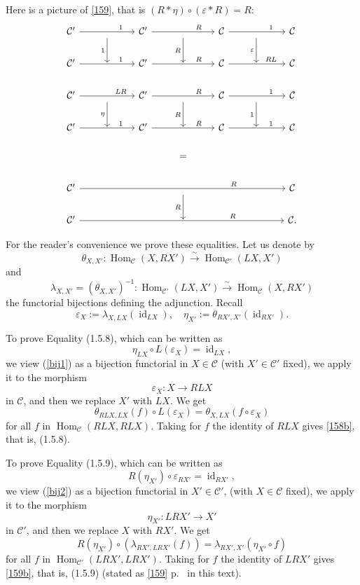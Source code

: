 \documentclass[12pt]{article}
\theoremstyle{remark}
\theoremstyle{definition}
\newcommand{\C}{\mathcal C}
\newcommand{\e}{\varepsilon}
\DeclareMathOperator{\id}{id}
\DeclareMathOperator{\Hom}{Hom}
\begin{document}
Here is a picture of \eqref{159}, that is $(R*\eta)\circ(\e*R)=R$: 
$$
\begin{tikzcd}
%
\C'\ar{rr}{}[near end]{1}&\ar{d}[swap]{1}&\C'\ar{rr}{}[near end]{R}&\ar{d}[swap]{R}&\C\ar{rr}{}[near end]{1}&\ar{d}[swap]{\e}&\C\\ 
%
\C'\ar{rr}{}[near end]{1}&{}&\C'\ar{rr}{}[near end]{R}&{}&\C\ar{rr}{}[near end]{RL}&{}&\C\\ 
%
\C'\ar{rr}{}[near end]{LR}&\ar{d}[swap]{\eta}&\C'\ar{rr}{}[near end]{R}&\ar{d}[swap]{R}&\C\ar{rr}{}[near end]{1}&\ar{d}[swap]{1}&\C\\ 
%
\C'\ar{rr}{}[near end]{1}&{}&\C'\ar{rr}{}[near end]{R}&{}&\C\ar{rr}{}[near end]{1}&{}&\C\\ 
%
&&&=\\ 
%
\C'\ar{rrrrrr}[near end]{R}&&&{}\ar{d}[swap]{R}&&&\C\\
%
\C'\ar{rrrrrr}[near end]{R}&&&{}&&&\C.
%
\end{tikzcd}
$$ 

For the reader's convenience we prove these equalities. Let us denote by 
%
\begin{equation}\label{bij1}
\theta_{X,X'}:\Hom_\C(X,RX')\overset\sim\to\Hom_{\C'}(LX,X')
\end{equation} 
% 
and 
% 
\begin{equation}\label{bij2}
\lambda_{X,X'}=(\theta_{X,X'})^{-1}:\Hom_{\C'}(LX,X')\overset\sim\to\Hom_\C(X,RX')
\end{equation} 
% 
the functorial bijections defining the adjunction. Recall 
$$
\e_X:=\lambda_{X,LX}(\id_{LX}),\quad\eta_{X'}:=\theta_{RX',X'}(\id_{RX'}).
$$ 

To prove Equality (1.5.8), which can be written as 
% 
\begin{equation}\label{158b} 
\eta_{LX}\circ L(\e_X)=\id_{LX}, 
\end{equation}
% 
we view (\ref{bij1}) as a bijection functorial in $X\in\C$ (with $X'\in\C'$ fixed), we apply it to the morphism 
$$
\e_X:X\to RLX
$$ 
in $\C$, and then we replace $X'$ with $LX$. We get 
$$
\theta_{RLX,LX}(f)\circ L(\e_X)=\theta_{X,LX}(f\circ\e_X)
$$
for all $f$ in $\Hom_\C(RLX,RLX)$. Taking for $f$ the identity of $RLX$ gives \eqref{158b}, that is, (1.5.8).

To prove Equality (1.5.9), which can be written as 
%
\begin{equation}\label{159b} 
R(\eta_{X'})\circ\e_{RX'}=\id_{RX'},
\end{equation}
% 
we view (\ref{bij2}) as a bijection functorial in $X'\in\C'$, (with $X\in\C$ fixed), we apply it to the morphism 
$$
\eta_{X'}:LRX'\to X'
$$ 
in $\C'$, and then we replace $X$ with $RX'$. We get 
$$
R(\eta_{X'})\circ(\lambda_{RX',LRX'}(f))=\lambda_{RX',X'}(\eta_{X'}\circ f)
$$
for all $f$ in $\Hom_{\C'}(LRX',LRX')$. Taking for $f$ the identity of $LRX'$ gives \eqref{159b}, that is, (1.5.9) (stated as \eqref{159} p.~\pageref{159} in this text). 
%
% 
\end{document}
